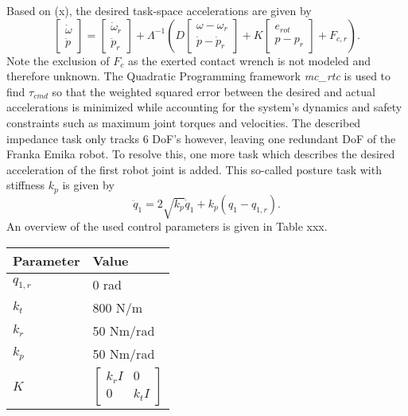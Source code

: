 \documentclass[a4paper, 10pt, conference]{ieeeconf}
\begin{document}
Based on (x), the desired task-space accelerations are given by
$$\begin{bmatrix} \dot{\omega}\\ \ddot{p}\end{bmatrix} = \begin{bmatrix} \dot{\omega}_{r}\\ \ddot{p}_{r}\end{bmatrix} + \Lambda^{-1} \left (  D \begin{bmatrix} {\omega} - {\omega}_{r} \\ \dot{p} - \dot{p}_{r} \end{bmatrix}  + K \begin{bmatrix} e_{rot} \\ {p} - {p}_{r} \end{bmatrix} +F_{c,r} \right ).$$
Note the exclusion of $F_c$ as the exerted contact wrench is not modeled and therefore unknown. The Quadratic Programming framework \textit{mc\_rtc} is used to find $\tau_{cmd}$ so that the weighted squared error between the desired and actual accelerations is minimized while accounting for the system's dynamics and safety constraints such as maximum joint torques and velocities. The described impedance task only tracks 6 DoF's however, leaving one redundant DoF of the Franka Emika robot. To resolve this, one more task which describes the desired acceleration of the first robot joint is added. This so-called posture task with stiffness $k_p$ is given by
$$\ddot{q}_1 = 2\sqrt{k_p}\dot{q}_1+k_p(q_1-q_{1,r}).$$
An overview of the used control parameters is given in Table xxx.

\begin{table}[h]
\centering
\begin{tabular}{l|l}
\hline
Parameter & Value                                                \\ \hline
$q_{1,r}$     & 0 rad                                              \\
$k_t$     & 800 N/m                                              \\
$k_r$     & 50 Nm/rad                                            \\
$k_p$     & 50 Nm/rad                                            \\
$K$       & $\begin{bmatrix} k_r I &0 \\ 0 & k_t I\end{bmatrix}$
\end{tabular}
\end{table}
\end{document}
